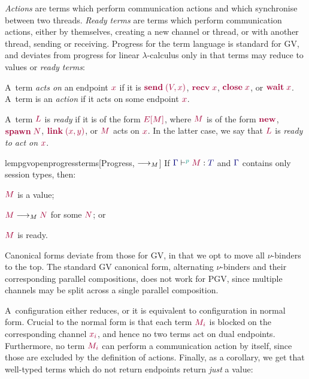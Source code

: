 \documentclass[main.tex]{subfiles}
\begin{document}
\emph{Actions} are terms which perform communication actions and which synchronise between two threads.
\emph{Ready terms} are terms which perform communication actions, either by themselves, \eg creating a new channel or thread, or with another thread, \eg sending or receiving.
Progress for the term language is standard for GV, and deviates from progress for linear $\lambda$-calculus only in that terms may reduce to values or \emph{ready terms}:
\begin{compacttheorems}
  \begin{definition}[Actions]%
    \label{def:pgv-actions}
    A~term \emph{acts on} an endpoint $\tm{x}$ if it is $\tm{\send\;\pair{V}{x}}$, $\tm{\recv\;{x}}$, $\tm{\close\;{x}}$, or $\tm{\wait\;{x}}$. A~term is an \emph{action} if it acts on some endpoint $\tm{x}$.
  \end{definition}
  \begin{definition}%
    \label{def:pgv-ready-actions}
    A~term $\tm{L}$ is \emph{ready} if it is of the form $\tm{\plug{E}{M}}$, where $\tm{M}$ is of the form $\tm{\new}$, $\tm{\spawn\;N}$, $\tm{\link\;\pair{x}{y}}$, or $\tm{M}$ acts on $\tm{x}$. In the latter case, we say that $\tm{L}$ is \emph{ready to act on} $\tm{x}$.
  \end{definition}
  \begin{restatablelemma}{lempgvopenprogressterms}[Progress, $\longrightarrow_{M}$]%
    \label{lem:pgv-open-progress-terms}
    If $\tseq[\cs{p}]{\ty{\Gamma}}{M}{T}$ and $\ty{\Gamma}$ contains only session types, then:
    \begin{enumerate*}[label= (\alph*) ]
    \item $\tm{M}$ is a value;
    \item $\tm{M}\tred\tm{N}$ for some $\tm{N}$; or
    \item $\tm{M}$ is ready.
    \end{enumerate*}
  \end{restatablelemma}
\end{compacttheorems}

Canonical forms deviate from those for GV, in that we opt to move all $\nu$-binders to the top. The standard GV canonical form, alternating $\nu$-binders and their corresponding parallel compositions, does not work for PGV, since multiple channels may be split across a single parallel composition.

A~configuration either reduces, or it is equivalent to configuration in normal form. Crucial to the normal form is that each term $\tm{M_i}$ is blocked on the corresponding channel $\tm{x_i}$, and hence no two terms act on dual endpoints. Furthermore, no term $\tm{M_i}$ can perform a communication action by itself, since those are excluded by the definition of actions.
Finally, as a corollary, we get that well-typed terms which do not return endpoints return \emph{just} a value:
\end{document}
